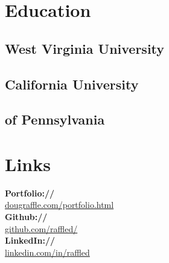 \documentclass[letterpaper]{deedy-resume} %
\begin{document}




\begin{minipage}[t]{0.35\textwidth} %


\section{Education} 
\subsection{West Virginia University}
\sectionspace %


\subsection{California University}
\subsection{of Pennsylvania}

\sectionspace %


\section{Links} 
{\bf Portfolio://}\\ \href{http://www.dougraffle.com/portfolio.html}{dougraffle.com/portfolio.html}\\
{\bf Github://}\\ \href{http://github.com/raffled/}{github.com/raffled/}\\
{\bf LinkedIn://}\\ \href{https://www.linkedin.com/in/raffled}{linkedin.com/in/raffled} \\
\sectionspace %


\end{minipage}
\end{document}
